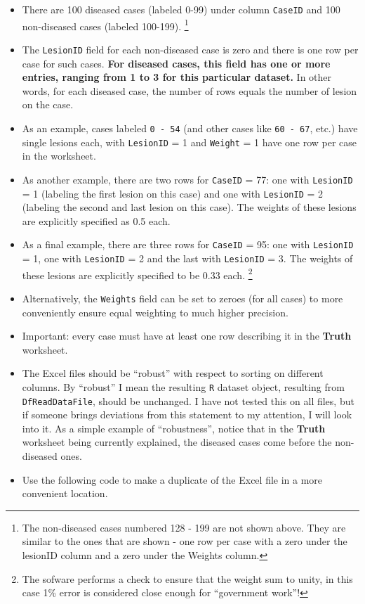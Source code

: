\documentclass[]{book}
\providecommand{\tightlist}{%
  \setlength{\itemsep}{0pt}\setlength{\parskip}{0pt}}
\let\rmarkdownfootnote\footnote%
\def\footnote{\protect\rmarkdownfootnote}
\begin{document}
\begin{itemize}
\tightlist
\item
  There are 100 diseased cases (labeled 0-99) under column \texttt{CaseID} and 100 non-diseased cases (labeled 100-199). \footnote{The non-diseased cases numbered 128 - 199 are not shown above. They are similar to the ones that are shown - one row per case with a zero under the lesionID column and a zero under the Weights column.}\\
\item
  The \texttt{LesionID} field for each non-diseased case is zero and there is one row per case for such cases. \textbf{For diseased cases, this field has one or more entries, ranging from 1 to 3 for this particular dataset.} In other words, for each diseased case, the number of rows equals the number of lesion on the case.
\item
  As an example, cases labeled \texttt{0\ -\ 54} (and other cases like \texttt{60\ -\ 67}, etc.) have single lesions each, with \texttt{LesionID} = 1 and \texttt{Weight} = 1 have one row per case in the worksheet.
\item
  As another example, there are two rows for \texttt{CaseID} = 77: one with \texttt{LesionID} = 1 (labeling the first lesion on this case) and one with \texttt{LesionID} = 2 (labeling the second and last lesion on this case). The weights of these lesions are explicitly specified as 0.5 each.
\item
  As a final example, there are three rows for \texttt{CaseID} = 95: one with \texttt{LesionID} = 1, one with \texttt{LesionID} = 2 and the last with \texttt{LesionID} = 3. The weights of these lesions are explicitly specified to be 0.33 each. \footnote{The sofware performs a check to ensure that the weight sum to unity, in this case 1\% error is considered close enough for ``government work''!}\\
\item
  Alternatively, the \texttt{Weights} field can be set to zeroes (for all cases) to more conveniently ensure equal weighting to much higher precision.
\item
  Important: every case must have at least one row describing it in the \textbf{Truth} worksheet.
\item
  The Excel files should be ``robust'' with respect to sorting on different columns. By ``robust'' I mean the resulting \texttt{R} dataset object, resulting from \texttt{DfReadDataFile}, should be unchanged. I have not tested this on all files, but if someone brings deviations from this statement to my attention, I will look into it. As a simple example of ``robustness'', notice that in the \textbf{Truth} worksheet being currently explained, the diseased cases come before the non-diseased ones.
\item
  Use the following code to make a duplicate of the Excel file in a more convenient location.
\end{itemize}
\end{document}
